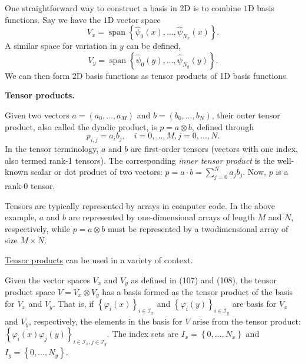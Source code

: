 \documentclass[../main.tex]{subfiles}
\begin{document}
	\noindent One straightforward way to construct a basis in $2 \mathrm{D}$ is to combine $1 \mathrm{D}$ basis functions. Say we have the $1 \mathrm{D}$ vector space
	\begin{equation}\label{eqa107}
		V_{x}=\operatorname{span}\left\{\hat{\psi}_{0}(x), \ldots, \hat{\psi}_{N_{x}}(x)\right\}.
	\end{equation}
	A similar space for variation in $y$ can be defined,
	\begin{equation}\label{eqa108}
		V_{y}=\operatorname{span}\left\{\hat{\psi}_{0}(y), \ldots, \hat{\psi}_{N_{y}}(y)\right\}.
	\end{equation}
	We can then form 2D basis functions as tensor products of 1D basis functions.
	\begin{mybox}
		\textbf{Tensor products.}
		
		Given two vectors $a=\left(a_{0}, \ldots, a_{M}\right)$ and $b=\left(b_{0}, \ldots, b_{N}\right)$, their outer tensor product, also called the dyadic product, is $p=a \otimes b$, defined through
		$$
		p_{i, j}=a_{i} b_{j}, \quad i=0, \ldots, M, j=0, \ldots, N .
		$$
		In the tensor terminology, $a$ and $b$ are first-order tensors (vectors with one
		index, also termed rank-1 tensors). The corresponding \textit{inner tensor product} is the well-known scalar or dot product of two vectors: $p=a \cdot b=\sum_{j=0}^{N} a_{j} b_{j}$. Now, $p$ is a rank-0 tensor.
		
		Tensors are typically represented by arrays in computer code. In the above example, $a$ and $b$ are represented by one-dimensional arrays of length $M$ and $N$, respectively, while $p=a \otimes b$ must be represented by a twodimensional array of size $M \times N$.
		
		\href{https://en.wikipedia.org/wiki/Tensor_product}{Tensor products} can be used in a variety of context.
	\end{mybox}
	
	Given the vector spaces $V_{x}$ and $V_{y}$ as defined in (107) and (108), the tensor product space $V=V_{x} \otimes V_{y}$ has a basis formed as the tensor product of the basis for $V_{x}$ and $V_{y}$. That is, if $\left\{\varphi_{i}(x)\right\}_{i \in \mathcal{I}_{x}}$ and $\left\{\varphi_{i}(y)\right\}_{i \in \mathcal{I}_{y}}$ are basis for $V_{x}$ and $V_{y}$, respectively, the elements in the basis for $V$ arise from the tensor product: $\left\{\varphi_{i}(x) \varphi_{j}(y)\right\}_{i \in \mathcal{I}_{x}, j \in \mathcal{I}_{y}}$. The index sets are $I_{x}=\left\{0, \ldots, N_{x}\right\}$ and $I_{y}=\left\{0, \ldots, N_{y}\right\}$.
	
\end{document}
